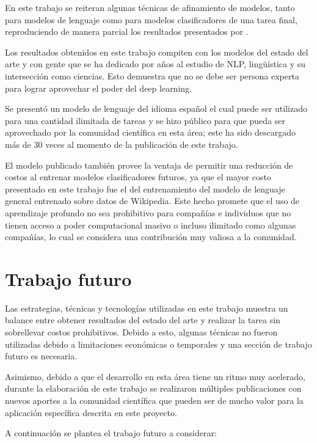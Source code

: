 En este trabajo se reiteran algunas técnicas de afinamiento de modelos, tanto para modelos de lenguaje como para modelos clasificadores de una tarea final, reproduciendo de manera parcial los resultados presentados por \citeauthor{howard2018}.

Los resultados obtenidos en este trabajo compiten con los modelos del estado del arte y con gente que se ha dedicado por años al estudio de NLP, lingüística y su intersección como ciencias. Esto demuestra que no se debe ser persona experta para lograr aprovechar el poder del deep learning.

Se presentó un modelo de lenguaje del idioma español el cual puede ser utilizado para una cantidad ilimitada de tareas y se hizo público para que pueda ser aprovechado por la comunidad científica en esta área; este ha sido descargado más de 30 veces al momento de la publicación de este trabajo.

El modelo publicado también provee la ventaja de permitir una reducción de costos al entrenar modelos clasificadores futuros, ya que el mayor costo presentado en este trabajo fue el del entrenamiento del modelo de lenguaje general entrenado sobre datos de Wikipedia. Este hecho promete que el uso de aprendizaje profundo no sea prohibitivo para compañías e individuos que no tienen acceso a poder computacional masivo o incluso ilimitado como algunas compañías, lo cual se considera una contribución muy valiosa a la comunidad.

\section{Trabajo futuro}

Las estrategias, técnicas y tecnologías utilizadas en este trabajo muestra un balance entre obtener resultados del estado del arte y realizar la tarea sin sobrellevar costos prohibitivos. Debido a esto, algunas técnicas no fueron utilizadas debido a limitaciones económicas o temporales y una sección de trabajo futuro es necesaria.

Asimismo, debido a que el desarrollo en esta área tiene un ritmo muy acelerado, durante la elaboración de este trabajo se realizaron múltiples publicaciones con nuevos aportes a la comunidad científica que pueden ser de mucho valor para la aplicación específica descrita en este proyecto.

A continuación se plantea el trabajo futuro a considerar:

